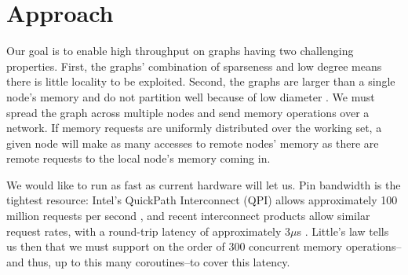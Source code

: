\documentclass{acm_proc_article-sp}
\begin{document}
\begin {comment}
\todo{ describe calls to prefetch-and-yield }

When a thread frays, for the sake of expediency, a fixed portion of
its stack is divided amongst the coroutines.  Given a finite stack,
each coroutine is constrained to execute a call tree of depth known to
be finite at compilation time: recursion is not yet permitted.

\todo{ discussion of coroutines \& synchronization } Were a coroutine to
block on a synchronization variable shared with other threads, the
entire fray would suspend execution.  This can lead to deadlock when,
for example, one coroutine waits to consume from another thread that
is waiting to consume what only another coroutine in this first fray
can produce.  Instead, coroutines must yield on failed synchronization
events, spinning rather than blocking, where were they bona fide
threads, blocking might be more efficient.

\todo{ say something about ``synchronization'' within a fray }

Coroutines completing their work yield without adding themselves to
the scheduling queue.  The last coroutine to exit in this way returns
as the main thread, as in the common  fork-join model of parallelism.

\end{comment}

\section{Approach}
\label{sec:approach}

Our goal is to enable high throughput on graphs having two challenging
properties. First, the graphs' combination of sparseness and low
degree means there is little locality to be exploited. Second, the
graphs are larger than a single node's memory and do not partition
well because of low diameter . We must spread the graph across multiple nodes
and send memory operations over a network. If memory requests are
uniformly distributed over the working set, a given node will make as
many accesses to remote nodes' memory as there are remote requests to the local node's memory coming in.

We would like to run as fast as current hardware will let us. Pin
bandwidth is the tightest resource: Intel's QuickPath Interconnect
(QPI) allows approximately 100 million requests per second
\cite{quickpath:website} , and recent interconnect products allow similar request
rates, with a round-trip latency of approximately 3$\mu$s
. Little's law tells us then that we must support on the
order of 300 concurrent memory operations--and thus, up to this many coroutines--to
cover this latency.
\end{document}
